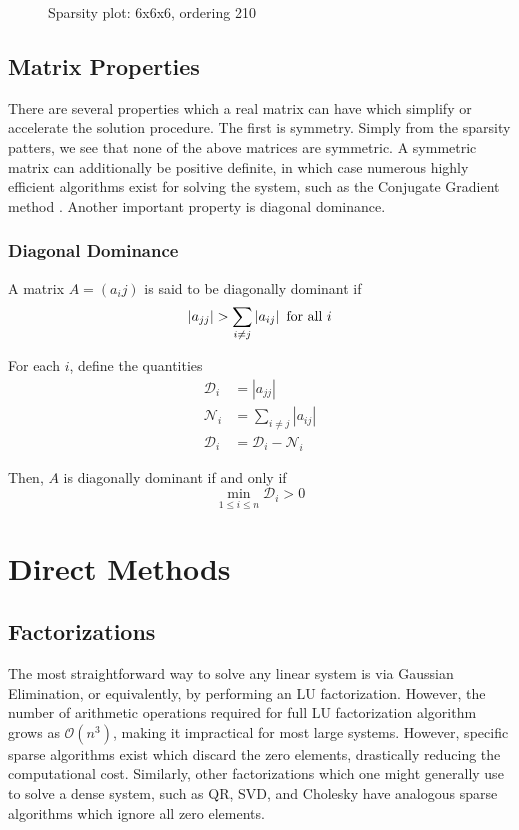 \documentclass[10pt]{article}
\newcommand\DD{\mathcal{D}}
\newcommand\QQ{\mathcal{D}}
\newcommand\NN{\mathcal{N}}
\newcommand\abs[1]{\left| #1 \right|}
\begin{document}
\begin{multicols}{2}
\begin{center}
\begin{minipage}[t]{.5\textwidth}
\begin{figure}[H]
    \caption{Sparsity plot: 6x6x6, ordering 210 }
\end{figure}
\end{minipage}%
\end{center}
\pagebreak

\subsection{Matrix Properties}
There are several properties which a real matrix can have which simplify or accelerate the solution procedure.
The first is symmetry.
Simply from the sparsity patters, we see that none of the above matrices are symmetric.
A symmetric matrix can additionally be positive definite, in which case numerous highly efficient algorithms exist for solving the system, such as the Conjugate Gradient method \citep{nocedal_numerical_1999}.
Another important property is diagonal dominance.

\subsubsection{Diagonal Dominance}
\label{sec:ddom}

A matrix $A=(a_ij)$ is said to be diagonally dominant if
\begin{equation}
	\abs{a_{jj}} > \sum_{i\neq j}\abs{a_{ij}} \,\, \mbox{for all}\,\, i \\
\end{equation}

For each $i$, define the quantities
\begin{align}
	\DD_i &= \abs{a_{jj}} \\
	\NN_i &= \sum_{i\neq j}\abs{a_{ij}} \\
	\QQ_i &= \DD_i - \NN_i
\end{align}

Then, $A$ is diagonally dominant if and only if
\begin{equation}
	\min_{1\leq i \leq n} \QQ_i > 0
\end{equation}

\section{Direct Methods}
\subsection{Factorizations}
The most straightforward way to solve any linear system is via Gaussian Elimination, or equivalently, by performing an LU factorization.
However, the number of arithmetic operations required for full LU factorization algorithm grows as $\mathcal{O}(n^3)$, making it impractical for most large systems.
However, specific sparse algorithms exist which discard the zero elements, drastically reducing the computational cost.
Similarly, other factorizations which one might generally use to solve a dense system, such as QR, SVD, and Cholesky have analogous sparse algorithms which ignore all zero elements.


\end{multicols}
\end{document}
